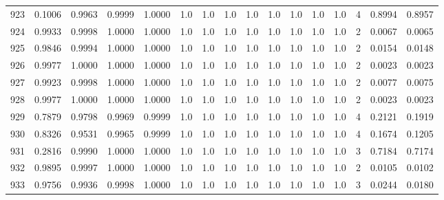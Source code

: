 \begin{tabular}{lrrrrrrrrrrrrrrr}
923 &      0.1006 &  0.9963 &  0.9999 &  1.0000 &     1.0 &     1.0 &     1.0 &     1.0 &     1.0 &     1.0 &      1.0 &        1.0 &      4 &                    0.8994 &                     0.8957 \\
924 &      0.9933 &  0.9998 &  1.0000 &  1.0000 &     1.0 &     1.0 &     1.0 &     1.0 &     1.0 &     1.0 &      1.0 &        1.0 &      2 &                    0.0067 &                     0.0065 \\
925 &      0.9846 &  0.9994 &  1.0000 &  1.0000 &     1.0 &     1.0 &     1.0 &     1.0 &     1.0 &     1.0 &      1.0 &        1.0 &      2 &                    0.0154 &                     0.0148 \\
926 &      0.9977 &  1.0000 &  1.0000 &  1.0000 &     1.0 &     1.0 &     1.0 &     1.0 &     1.0 &     1.0 &      1.0 &        1.0 &      2 &                    0.0023 &                     0.0023 \\
927 &      0.9923 &  0.9998 &  1.0000 &  1.0000 &     1.0 &     1.0 &     1.0 &     1.0 &     1.0 &     1.0 &      1.0 &        1.0 &      2 &                    0.0077 &                     0.0075 \\
928 &      0.9977 &  1.0000 &  1.0000 &  1.0000 &     1.0 &     1.0 &     1.0 &     1.0 &     1.0 &     1.0 &      1.0 &        1.0 &      2 &                    0.0023 &                     0.0023 \\
929 &      0.7879 &  0.9798 &  0.9969 &  0.9999 &     1.0 &     1.0 &     1.0 &     1.0 &     1.0 &     1.0 &      1.0 &        1.0 &      4 &                    0.2121 &                     0.1919 \\
930 &      0.8326 &  0.9531 &  0.9965 &  0.9999 &     1.0 &     1.0 &     1.0 &     1.0 &     1.0 &     1.0 &      1.0 &        1.0 &      4 &                    0.1674 &                     0.1205 \\
931 &      0.2816 &  0.9990 &  1.0000 &  1.0000 &     1.0 &     1.0 &     1.0 &     1.0 &     1.0 &     1.0 &      1.0 &        1.0 &      3 &                    0.7184 &                     0.7174 \\
932 &      0.9895 &  0.9997 &  1.0000 &  1.0000 &     1.0 &     1.0 &     1.0 &     1.0 &     1.0 &     1.0 &      1.0 &        1.0 &      2 &                    0.0105 &                     0.0102 \\
933 &      0.9756 &  0.9936 &  0.9998 &  1.0000 &     1.0 &     1.0 &     1.0 &     1.0 &     1.0 &     1.0 &      1.0 &        1.0 &      3 &                    0.0244 &                     0.0180 \\

\end{tabular}
